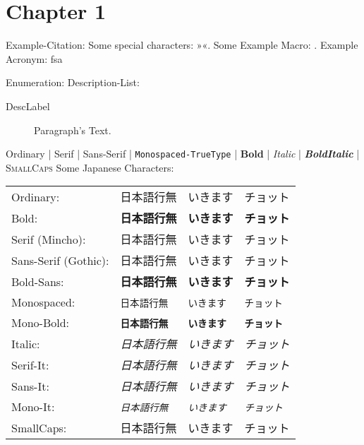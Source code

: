 
\chapter{Chapter 1}
\label{chap:chapter1}

Example-Citation:
\cite{DenKr_denkrement1_indeco}
\nl%
Some special characters:
»«.
\nl%
Some Example Macro:
.
\nl%
Example Acronym:
\gls{fsa}

\npi%
Enumeration:\nl
Description-List:
\begin{description}
\item[DescLabel]
    Paragraph's Text.
\end{description}

\npi%
Ordinary | \textrm{Serif} | \textsf{Sans-Serif} | \texttt{Monospaced-TrueType} | \textbf{Bold} | \textit{Italic} | \textit{\textbf{BoldItalic}} | \textsc{SmallCaps}\nl%
Some Japanese Characters:\nl%
\begin{tabular}{llll}%
Ordinary:&日本語行無&いきます&チョット\\%
Bold:&\textbf{日本語行無}&\textbf{いきます}&\textbf{チョット}\\%
Serif (Mincho):&\textrm{日本語行無}&\textrm{いきます}&\textrm{チョット}\\%
Sans-Serif (Gothic):&\textsf{日本語行無}&\textsf{いきます}&\textsf{チョット}\\%
Bold-Sans:&\textbf{\textsf{日本語行無}}&\textbf{\textsf{いきます}}&\textbf{\textsf{チョット}}\\%
Monospaced:&\texttt{日本語行無}&\texttt{いきます}&\texttt{チョット}\\%
Mono-Bold:&\textbf{\texttt{日本語行無}}&\textbf{\texttt{いきます}}&\textbf{\texttt{チョット}}\\%
\hline%
Italic:&\textit{日本語行無}&\textit{いきます}&\textit{チョット}\\%
Serif-It:&\textit{\textrm{日本語行無}}&\textit{\textrm{いきます}}&\textit{\textrm{チョット}}\\%
Sans-It:&\textit{\textsf{日本語行無}}&\textit{\textsf{いきます}}&\textit{\textsf{チョット}}\\%
Mono-It:&\textit{\texttt{日本語行無}}&\textit{\texttt{いきます}}&\textit{\texttt{チョット}}\\%
\hline%
SmallCaps:&\textsc{日本語行無}&\textsc{いきます}&\textsc{チョット}\\%
\end{tabular}%


